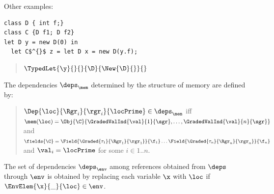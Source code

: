Other examples: 
\begin{lstlisting}
class D { int f;} 
class C {D f1; D f2}
let D y = new D(0) in
  let C$^{}$ z = let D x = new D(y.f); 
\end{lstlisting}
\begin{quote}
$\TypedLet{\y}{}{}{\D}{\New{\D}{}}{}$
\end{quote}


The dependencies $\deps_\mem$ determined by the structure of memory are defined by:
\begin{quote}
$\Dep{\loc}{\Rgr_i}{\rgr_i}{\locPrime}\in\deps_\mem$ iff  $\mem(\loc)=\Obj{\C}{\GradedValInd{\val}{1}{\sgr},\ldots,\GradedValInd{\val}{n}{\sgr}}$ and $\fields{\C}=\Field{\Graded{\tau_1}{\Rgr_1}{\rgr_1}}{\f_1} \ldots \Field{\Graded{\tau_n}{\Rgr_n}{\rgr_n}}{\f_n}$
 and $\val_i=\locPrime$ for some $i\in 1..n$.
\end{quote}


The set of dependencies $\deps_{\env}$ among references obtained from $\deps$ through ${\env}$ is obtained by replacing each variable $\x$ with $\loc$ if  $\EnvElem{\x}{\_}{\loc}\in\env$. 





